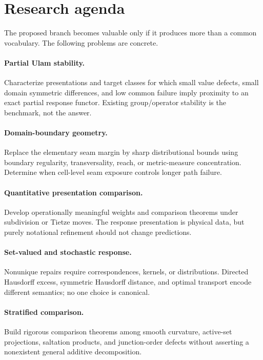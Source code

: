 \documentclass[11pt]{article}
\theoremstyle{definition}
\theoremstyle{remark}
\begin{document}
\section{Research agenda}

The proposed branch becomes valuable only if it produces more than a common
vocabulary. The following problems are concrete.

\paragraph{Partial Ulam stability.}
Characterize presentations and target classes for which small value defects,
small domain symmetric differences, and low common failure imply proximity
to an exact partial response functor. Existing group/operator stability is the
benchmark, not the answer.

\paragraph{Domain-boundary geometry.}
Replace the elementary seam margin by sharp distributional bounds using
boundary regularity, transversality, reach, or metric-measure concentration.
Determine when cell-level seam exposure controls longer path failure.

\paragraph{Quantitative presentation comparison.}
Develop operationally meaningful weights and comparison theorems under
subdivision or Tietze moves. The response presentation is physical data, but
purely notational refinement should not change predictions.

\paragraph{Set-valued and stochastic response.}
Nonunique repairs require correspondences, kernels, or distributions. Directed
Hausdorff excess, symmetric Hausdorff distance, and optimal transport encode
different semantics; no one choice is canonical.

\paragraph{Stratified comparison.}
Build rigorous comparison theorems among smooth curvature, active-set
projections, saltation products, and junction-order defects without asserting
a nonexistent general additive decomposition.
\end{document}
